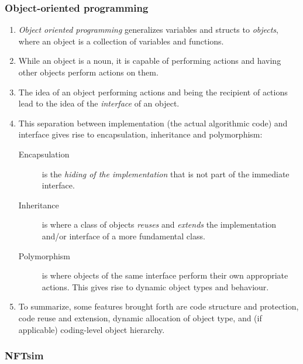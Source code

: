 \documentclass[12pt,a4paper]{article}
\begin{document}
\subsubsection{Object-oriented programming}

\begin{enumerate}
\item \emph{Object oriented programming} generalizes variables and structs to \emph{objects}, where an object is a collection of variables and functions.

\item While an object is a noun, it is capable of performing actions and having other objects perform actions on them.

\item The idea of an object performing actions and being the recipient of actions lead to the idea of the \emph{interface} of an object.

\item This separation between implementation (the actual algorithmic code) and interface gives rise to encapsulation, inheritance and polymorphism:
    \begin{description}
        \item [Encapsulation] is the \emph{hiding of the implementation} that is not part of the immediate interface.
        \item [Inheritance] is where a class of objects \emph{reuses} and \emph{extends} the implementation and/or interface of a more fundamental class.
        \item [Polymorphism] is where objects of the same interface perform their own appropriate actions. This gives rise to dynamic object types and behaviour.
    \end{description}

\item To summarize, some features brought forth are code structure and protection, code reuse and extension, dynamic allocation of object type, and (if applicable) coding-level object hierarchy.
\end{enumerate}

\subsubsection{NFTsim}
\end{document}

